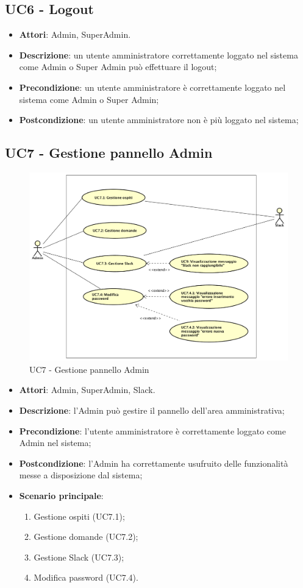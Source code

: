 \documentclass[../AnalisiDeiRequisiti.tex]{subfiles}
\begin{document}
\subsection{UC6 - Logout} 
\label{sssec:UC6} 
\begin{itemize} 
\item \textbf{Attori}: Admin, SuperAdmin.
\item \textbf{Descrizione}: un utente amministratore correttamente loggato nel sistema come Admin o Super Admin può effettuare il logout;
\item \textbf{Precondizione}: un utente amministratore è correttamente loggato nel sistema come Admin o Super Admin;
\item \textbf{Postcondizione}: un utente amministratore non è più loggato nel sistema;
\end{itemize} 
\newpage
\subsection{UC7 - Gestione pannello Admin} 
\label{sssec:UC7} 
\begin{figure}[!h]
	\centering
	\includegraphics[width=\textwidth]{UseCases/UC7_GestionePannelloAdmin/UC7_GestionePannelloAdmin.png}
	\caption{UC7 - Gestione pannello Admin}
\end{figure}
\begin{itemize} 
\item \textbf{Attori}: Admin, SuperAdmin, Slack.
\item \textbf{Descrizione}: l'Admin può gestire il pannello dell'area amministrativa;
\item \textbf{Precondizione}: l'utente amministratore è correttamente loggato come Admin nel sistema;
\item \textbf{Postcondizione}: l'Admin ha correttamente usufruito delle funzionalità messe a disposizione dal sistema;
\item \textbf{Scenario principale}: \begin{enumerate}\item Gestione ospiti (UC7.1);\item Gestione domande (UC7.2);\item Gestione Slack (UC7.3);\item Modifica password (UC7.4). 
 \end{enumerate}
\end{itemize} 
\newpage
\end{document}
